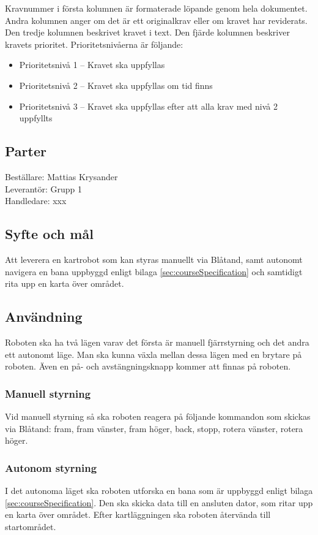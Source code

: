 \documentclass[a4paper,11pt]{article}
\newcommand{\LIPSprojektgrupp}{Grupp 1}
\begin{document}
Kravnummer i första kolumnen är formaterade löpande genom hela dokumentet. Andra kolumnen anger om det är ett originalkrav eller om kravet har reviderats. Den tredje kolumnen beskrivet kravet i text. Den fjärde kolumnen beskriver kravets prioritet. Prioritetsnivåerna är följande:
\begin{itemize}
    \item Prioritetsnivå 1 – Kravet ska uppfyllas
    \item Prioritetsnivå 2 – Kravet ska uppfyllas om tid finns
    \item Prioritetsnivå 3 – Kravet ska uppfyllas efter att alla krav med nivå 2 uppfyllts 
\end{itemize}
\subsection{Parter}
Beställare: Mattias Krysander \\
Leverantör: \LIPSprojektgrupp \\
Handledare: xxx 

\subsection{Syfte och mål}
Att leverera en kartrobot som kan styras manuellt via Blåtand, samt autonomt navigera en bana uppbyggd enligt bilaga \ref{sec:courseSpecification} och samtidigt rita upp en karta över området.  
\subsection{Användning}
Roboten ska ha två lägen varav det första är manuell fjärrstyrning och det andra ett autonomt läge. Man ska kunna växla mellan dessa lägen med en brytare på roboten. Även en på- och avstängningsknapp kommer att finnas på roboten.
\subsubsection{Manuell styrning}
Vid manuell styrning så ska roboten reagera på följande kommandon som skickas via Blåtand: fram, fram vänster, fram höger, back, stopp, rotera vänster, rotera höger. 
\subsubsection{Autonom styrning}
I det autonoma läget ska roboten utforska en bana som är uppbyggd enligt bilaga \ref{sec:courseSpecification}. Den ska skicka data till en ansluten dator, som ritar upp en karta över området. Efter kartläggningen ska roboten återvända till startområdet. 
\end{document}
